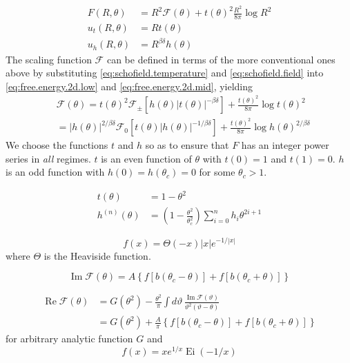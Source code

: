 \documentclass[
  aps,
  prb,
  reprint,
  longbibliography,
  floatfix
]{revtex4-2}
\begin{document}
\begin{align}
  \label{eq:schofield.free.energy}
  F(R, \theta) &= R^2\mathcal F(\theta) + t(\theta)^2\frac{R^2}{8\pi}\log R^2 \\
  \label{eq:schofield.temperature}
  u_t(R, \theta) &= Rt(\theta) \\
  \label{eq:schofield.field}
  u_h(R, \theta) &= R^{\beta\delta}h(\theta)
\end{align}
The scaling function $\mathcal F$ can be defined in terms of the more conventional ones above by substituting \eqref{eq:schofield.temperature} and \eqref{eq:schofield.field} into \eqref{eq:free.energy.2d.low} and \eqref{eq:free.energy.2d.mid}, yielding
\begin{equation}
  \begin{aligned}
    &\mathcal F(\theta)
    =t(\theta)^2\mathcal F_\pm\left[h(\theta)|t(\theta)|^{-\beta\delta}\right]
      +\frac{t(\theta)^2}{8\pi}\log t(\theta)^2 \\
    &=|h(\theta)|^{2/\beta\delta}\mathcal F_0\left[t(\theta)|h(\theta)|^{-1/\beta\delta}\right]
      +\frac{t(\theta)^2}{8\pi}\log h(\theta)^{2/\beta\delta}
  \end{aligned}
\end{equation}
We choose the functions $t$ and $h$ so as to ensure that $F$ has an integer power series in \emph{all} regimes. $t$ is an even function of $\theta$ with $t(0)=1$ and $t(1)=0$. $h$ is an odd function with $h(0)=h(\theta_c)=0$ for some $\theta_c>1$.

\begin{align}
  t(\theta)&=1-\theta^2 \\
  h^{(n)}(\theta)&=\left(1-\frac{\theta^2}{\theta_c^2}\right)\sum_{i=0}^nh_i\theta^{2i+1}
\end{align}


\begin{equation}
  f(x)=\Theta(-x) |x| e^{-1/|x|}
\end{equation}
where $\Theta$ is the Heaviside function.

\begin{equation}
  \operatorname{Im}\mathcal F(\theta)=A\left\{f\left[b(\theta_c-\theta)\right]+f\left[b(\theta_c+\theta)\right]\right\}
\end{equation}

\begin{equation}
  \begin{aligned}
    \operatorname{Re}\mathcal F(\theta)
      &=G(\theta^2)-\frac{\theta^2}\pi\int d\vartheta\, \frac{\operatorname{Im}\mathcal F(\vartheta)}{\vartheta^2(\vartheta-\theta)} \\
      &=G(\theta^2)+\frac A\pi\left\{f[b(\theta_c-\theta)]+f[b(\theta_c+\theta)]\right\}
  \end{aligned}
\end{equation}
for arbitrary analytic function $G$ and
\begin{equation}
  f(x)=xe^{1/x}\operatorname{Ei}(-1/x)
\end{equation}
\end{document}
